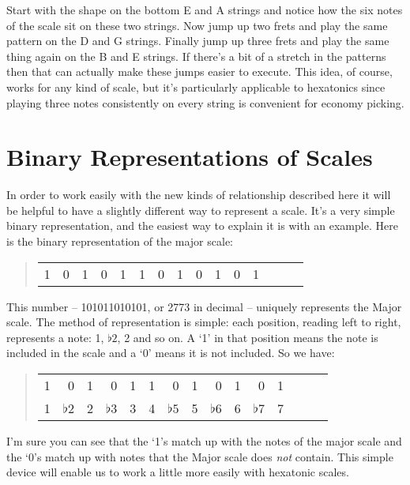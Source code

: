 \documentclass[english]{./gbook}
\begin{document}
\begin{large}
Start with the shape on the bottom E and A strings and notice how the six notes of the scale sit on these two strings. Now jump up two frets and play the same pattern on the D and G strings. Finally jump up three frets and play the same thing again on the B and E strings. If there's a bit of a stretch in the patterns then that can actually make these jumps easier to execute. This idea, of course, works for any kind of scale, but it's particularly applicable to hexatonics since playing three notes consistently on every string is convenient for economy picking.

\section{Binary Representations of Scales}

In order to work easily with the new kinds of relationship described here it will be helpful to have a slightly different way to represent a scale. It's a very simple binary representation, and the easiest way to explain it is with an example. Here is the binary representation of the major scale:
\begin{quote}
\begin{tabular}{rrrrrrrrrrrrrrr}
	1 & 0 &1 & 0 &1 & 1 & 0 & 1 & 0 & 1 & 0 & 1
\end{tabular}
\end{quote}
This number -- 101011010101, or 2773 in decimal -- uniquely represents the Major scale. The method of representation is simple: each position, reading left to right, represents a note: 1, $\flat2$, 2 and so on. A `1' in that position means the note is included in the scale and a `0' means it is not included. So we have:
\begin{quote}
\begin{tabular}{rrrrrrrrrrrrrrr}
	1 & 0 &1 & 0 &1 & 1 & 0 & 1 & 0 & 1 & 0 & 1 \\
	1 & $\flat2$ &2 & $\flat3$ &3 & 4 & $\flat5$ & 5 & $\flat6$ & 6 & $\flat7$ & 7
\end{tabular}
\end{quote}
I'm sure you can see that the `1's match up with the notes of the major scale and the `0's match up with notes that the Major scale does \emph{not} contain. This simple device will enable us to work a little more easily with hexatonic scales.


\end{large}
\end{document}
